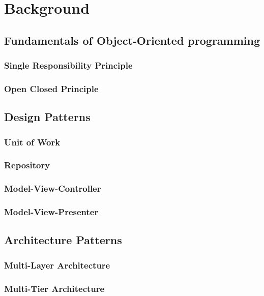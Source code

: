 \chapter{Background}
\section{Fundamentals of Object-Oriented programming}
\subsection{Single Responsibility Principle}
\subsection{Open Closed Principle}

\section{Design Patterns}
\subsection{Unit of Work}
\subsection{Repository}
\subsection{Model-View-Controller}
\subsection{Model-View-Presenter}

\section{Architecture Patterns}
\subsection{Multi-Layer Architecture}
\subsection{Multi-Tier Architecture}
\newpage
